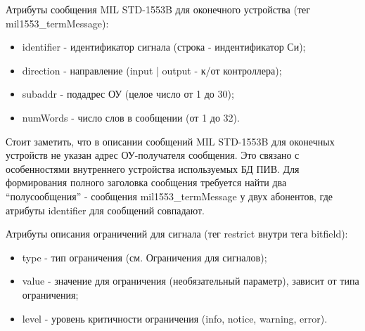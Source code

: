 Атрибуты сообщения MIL STD-1553B для оконечного устройства (тег 
mil1553\_termMessage):

\begin{itemize}
 \item identifier - идентификатор сигнала (строка - индентификатор Си);
 \item direction - направление (input | output - к/от контроллера);
 \item subaddr - подадрес ОУ (целое число от 1 до 30);
 \item numWords - число слов в сообщении (от 1 до 32).
\end{itemize}

Стоит заметить, что в описании сообщений MIL STD-1553B для оконечных устройств 
не указан адрес ОУ-получателя сообщения. Это связано с особенностями 
внутреннего устройства используемых БД ПИВ. Для формирования полного заголовка 
сообщения требуется найти два ``полусообщения'' - сообщения 
mil1553\_termMessage у двух абонентов, где атрибуты identifier для сообщений 
совпадают.

Атрибуты описания ограничений для сигнала (тег restrict внутри тега bitfield):

\begin{itemize}
 \item type - тип ограничения (см. Ограничения для сигналов); %
 \item value - значение для ограничения (необязательный параметр), зависит от 
типа ограничения;
 \item level - уровень критичности ограничения (info, notice, warning, error).
\end{itemize}

